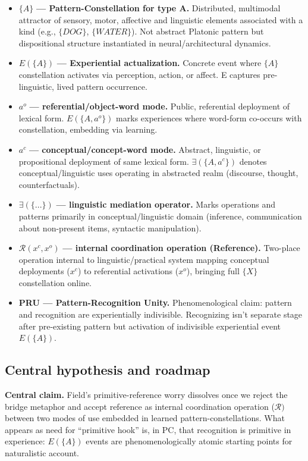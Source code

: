 \documentclass[12pt]{article}
\begin{document}
\begin{itemize}
\item
  \(\{A\}\) \textbf{--- Pattern-Constellation for type A.} Distributed, multimodal attractor of sensory, motor, affective and linguistic elements associated with a kind (e.g., \(\{DOG\}\), \(\{WATER\}\)). Not abstract Platonic pattern but dispositional structure instantiated in neural/architectural dynamics.
\item
  \(E(\{A\})\) \textbf{--- Experiential actualization.} Concrete event where \(\{A\}\) constellation activates via perception, action, or affect. E captures pre-linguistic, lived pattern occurrence.
\item
  \(a^o\) \textbf{--- referential/object-word mode.} Public, referential deployment of lexical form. \(E(\{A, a^o\})\) marks experiences where word-form co-occurs with constellation, embedding via learning.
\item
  \(a^c\) \textbf{--- conceptual/concept-word mode.} Abstract, linguistic, or propositional deployment of same lexical form. \(\exists(\{A, a^c\})\) denotes conceptual/linguistic uses operating in abstracted realm (discourse, thought, counterfactuals).
\item
  \(\exists(\{...\})\) \textbf{--- linguistic mediation operator.} Marks operations and patterns primarily in conceptual/linguistic domain (inference, communication about non-present items, syntactic manipulation).
\item
  \(\mathcal{R}(x^c, x^o)\) \textbf{--- internal coordination operation (Reference).} Two-place operation internal to linguistic/practical system mapping conceptual deployments (\(x^c\)) to referential activations (\(x^o\)), bringing full \(\{X\}\) constellation online.
\item
  \textbf{PRU --- Pattern-Recognition Unity.} Phenomenological claim: pattern and recognition are experientially indivisible. Recognizing isn't separate stage after pre-existing pattern but activation of indivisible experiential event \(E(\{A\})\).
\end{itemize}

\subsection{Central hypothesis and roadmap}\label{central-hypothesis-and-roadmap}

\textbf{Central claim.} Field's primitive-reference worry dissolves once we reject the bridge metaphor and accept reference as internal coordination operation (\(\mathcal{R})\) between two modes of use embedded in learned pattern-constellations. What appears as need for ``primitive hook'' is, in PC, that recognition is primitive in experience: \(E(\{A\})\) events are phenomenologically atomic starting points for naturalistic account.
\end{document}
